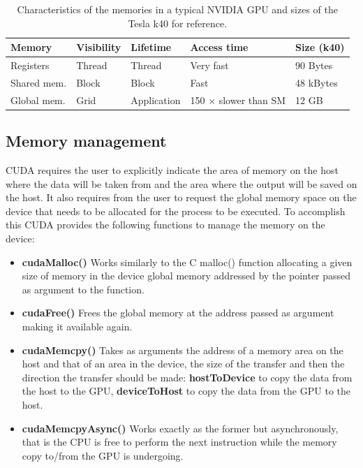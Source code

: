 \begin{center}
\begin{table}[h]
\begin{tabular}{ l | l | l | l | l}
\textbf{Memory} & \textbf{Visibility} & \textbf{Lifetime} & \textbf{Access time} & \textbf{Size (k40)}\\
\hline
Registers & Thread & Thread & Very fast & 90 Bytes \\
Shared mem. & Block & Block & Fast & 48 kBytes \\
Global mem. & Grid & Application & 150 $\times$ slower than SM & 12 GB \\
\end{tabular}
\caption{Characteristics of the memories in a typical NVIDIA GPU and sizes of the Tesla k40 for reference.}
\label{tabMemory}
\end{table}
\end{center}

\subsection{Memory management}
CUDA requires the user to explicitly indicate the area of memory on the host where the data will be taken from and the area where the output will be saved on the host.
It also requires from the user to request the global memory space on the device that needs to be allocated for the process to be executed.
To accomplish this CUDA provides the following functions to manage the memory on the device:
\begin{itemize}
\item \textbf{cudaMalloc()} Works similarly to the C malloc() function allocating a given size of memory in the device global memory addressed by the pointer passed as argument to the function.
\item \textbf{cudaFree()} Frees the global memory at the address passed as argument making it available again.
\item \textbf{cudaMemcpy()} Takes as arguments the address of a memory area on the host and that of an area in the device, the size of the transfer and then the direction the transfer should be made: \textbf{hostToDevice} to copy the data from the host to the GPU, \textbf{deviceToHost} to copy the data from the GPU to the host.
\item \textbf{cudaMemcpyAsync()} Works exactly as the former but asynchronously, that is the CPU is free to perform the next instruction while the memory copy to/from the GPU is undergoing.
\end{itemize}

